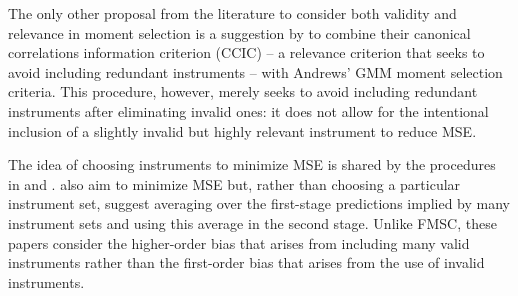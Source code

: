 The only other proposal from the literature to consider both validity and relevance in moment selection is a suggestion by \cite{HallPeixe2003} to combine their canonical correlations information criterion (CCIC) -- a relevance criterion that seeks to avoid including redundant instruments -- with Andrews' GMM moment selection criteria. 
This procedure, however, merely seeks to avoid including redundant instruments after eliminating invalid ones: it does not allow for the intentional inclusion of a slightly invalid but highly relevant instrument to reduce MSE. 






The idea of choosing instruments to minimize MSE is shared by the procedures in \cite{DonaldNewey2001} and \cite{DonaldImbensNewey2009}. 
\cite{KuersteinerOkui2010} also aim to minimize MSE but, rather than choosing a particular instrument set, suggest averaging over the first-stage predictions implied by many instrument sets and using this average in the second stage. 
Unlike FMSC, these papers consider the higher-order bias that arises from including many valid instruments rather than the first-order bias that arises from the use of invalid instruments.

